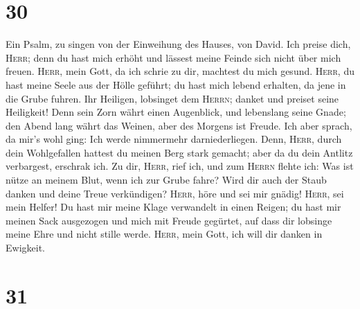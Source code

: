 \hypertarget{section-29}{%
\section{30}\label{section-29}}

 Ein Psalm, zu singen von der Einweihung des Hauses, von
David.  Ich preise dich, \textsc{Herr}; denn du hast mich
erhöht und lässest meine Feinde sich nicht über mich freuen.
 \textsc{Herr}, mein Gott, da ich schrie zu dir, machtest
du mich gesund.  \textsc{Herr}, du hast meine Seele aus
der Hölle geführt; du hast mich lebend erhalten, da jene in die Grube
fuhren.  Ihr Heiligen, lobsinget dem \textsc{Herrn};
danket und preiset seine Heiligkeit!  Denn sein Zorn währt
einen Augenblick, und lebenslang seine Gnade; den Abend lang währt das
Weinen, aber des Morgens ist Freude.  Ich aber sprach, da
mir's wohl ging: Ich werde nimmermehr darniederliegen. 
Denn, \textsc{Herr}, durch dein Wohlgefallen hattest du meinen Berg
stark gemacht; aber da du dein Antlitz verbargest, erschrak ich.
 Zu dir, \textsc{Herr}, rief ich, und zum \textsc{Herrn}
flehte ich:  Was ist nütze an meinem Blut, wenn ich zur
Grube fahre? Wird dir auch der Staub danken und deine Treue verkündigen?
 \textsc{Herr}, höre und sei mir gnädig! \textsc{Herr},
sei mein Helfer!  Du hast mir meine Klage verwandelt in
einen Reigen; du hast mir meinen Sack ausgezogen und mich mit Freude
gegürtet,  auf dass dir lobsinge meine Ehre und nicht
stille werde. \textsc{Herr}, mein Gott, ich will dir danken in Ewigkeit.

\hypertarget{section-30}{%
\section{31}\label{section-30}}

